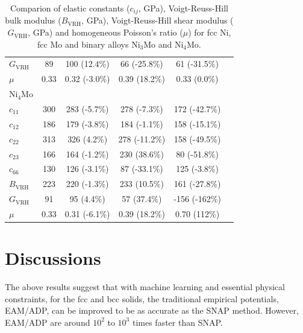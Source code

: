 \documentclass[prb,reprint]{revtex4-2}
\begin{document}
\begin{table}[h]
\begin{tabular}{lccccc}
$G_{\mathrm{VRH}}$ & 89 & 100 (12.4\%) & 66 (-25.8\%) & 61 (-31.5\%) & \\
$\mu$ & 0.33 & 0.32 (-3.0\%) & 0.39 (18.2\%) & 0.33 (0.0\%) & \\
\hline
Ni$_4$Mo \\
$c_{11}$ & 300 & 283 (-5.7\%) & 278 (-7.3\%) & 172 (-42.7\%) & \\
$c_{12}$ & 186 & 179 (-3.8\%) & 184 (-1.1\%) & 158 (-15.1\%) & \\
$c_{22}$ & 313 & 326 (4.2\%) & 278 (-11.2\%) & 158 (-49.5\%) & \\
\color{blue} $c_{23}$ & 166 & 164 (-1.2\%) & 230 (38.6\%) & 80 (-51.8\%) & \\
\color{blue} $c_{66}$ & 130 & 126 (-3.1\%) & 87 (-33.1\%) & 125 (-3.8\%) & \\
$B_{\mathrm{VRH}}$ & 223 & 220 (-1.3\%) & 233 (10.5\%) & 161 (-27.8\%) & \\
$G_{\mathrm{VRH}}$ & 91 & 95 (4.4\%) & 57 (37.4\%) & -156 (-162\%) & \\
$\mu$ & 0.33 & 0.31 (-6.1\%) & 0.39 (18.2\%) & 0.70 (112\%) & \\
\hline
\end{tabular}
\caption{\label{table:NiMo_elastic_constants}
Comparion of elastic constants ($c_{ij}$, GPa), Voigt-Reuss-Hill bulk modulus 
($B_{\mathrm{VRH}}$, GPa), Voigt-Reuss-Hill shear modulus ($G_{\mathrm{VRH}}$, 
GPa) and homogeneous Poisson's ratio ($\mu$) for fcc Ni, fcc Mo and binary 
alloys Ni$_{3}$Mo and Ni$_{4}$Mo.
}
\end{table}

% 
%
\section{Discussions}
\label{sec:discussions}

The above results suggest that with machine learning and essential physical 
constraints, for the fcc and bcc solids, the traditional empirical potentials, 
EAM/ADP, can be improved to be as accurate as the SNAP method. However, 
EAM/ADP are around $10^2$ to $10^3$ times faster than SNAP. 
\end{document}
